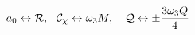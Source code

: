 \begin{equation}
\label{1eq21} a_0 \leftrightarrow {\cal R},~~ {\cal C}_{\chi}
\leftrightarrow \omega_3 M,~~~ {\cal Q} \leftrightarrow \pm
\frac{3 \omega_3 Q}{4}
\end{equation}

